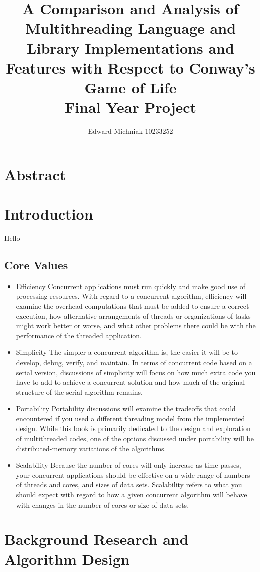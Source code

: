 \documentclass[11pt]{article} %
\title{A Comparison and Analysis of Multithreading Language and Library Implementations and Features with Respect to Conway's Game of Life\\Final Year Project}
\author{Edward Michniak 10233252}
\date{} %
\begin{document}
\maketitle
\tableofcontents
\pagebreak
\section{Abstract}
\section{Introduction}
Hello
\subsection{Core Values}
\begin{itemize}
\item Efficiency
\subitem Concurrent applications must run quickly and make good use of processing resources. With regard to a concurrent algorithm, efficiency will examine the overhead computations that must be added to ensure a correct execution, how alternative arrangements of threads or organizations of tasks might work better or worse, and what other problems there could be with the performance of the threaded application.
\item Simplicity
\subitem The simpler a concurrent algorithm is, the easier it will be to develop, debug, verify, and maintain. In terms of concurrent code based on a serial version, discussions of simplicity will focus on how much extra code you have to add to achieve a concurrent solution and how much of the original structure of the serial algorithm remains.
\item Portability
\subitem Portability discussions will examine the tradeoffs that could encountered if you used a different threading model from the implemented design. While this book is primarily dedicated to the design and exploration of multithreaded codes, one of the options discussed under portability will be distributed-memory variations of the algorithms.
\item Scalability
\subitem Because the number of cores will only increase as time passes, your concurrent applications should be effective on a wide range of numbers of threads and cores, and sizes of data sets. Scalability refers to what you should expect with regard to how a given concurrent algorithm will behave with changes in the number of cores or size of data sets.
\end{itemize}
\section{Background Research and Algorithm Design}
\end{document}
